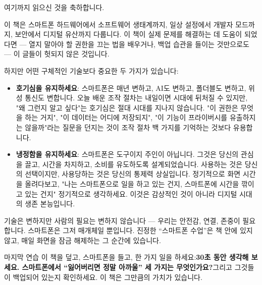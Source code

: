 
여기까지 읽으신 것을 축하합니다.

이 책은 스마트폰 하드웨어에서 소프트웨어 생태계까지, 일상 설정에서 개발자 모드까지, 보안에서 디지털 유산까지 다룹니다. 이 책이 실제 문제를 해결하는 데 도움이 되었다면 — 열지 말아야 할 권한을 끄는 법을 배우거나, 백업 습관을 들이는 것만으로도 — 이 글들이 헛되지 않은 것입니다.

하지만 어떤 구체적인 기술보다 중요한 두 가지가 있습니다:

\begin{itemize}
  \item \textbf{호기심을 유지하세요}: 스마트폰은 매년 변하고, AI도 변하고, 폴더블도 변하고, 위성 통신도 변합니다. 오늘 배운 조작 절차는 내일이면 시대에 뒤처질 수 있지만, "왜 그런지 알고 싶다"는 호기심은 절대 시대를 지나지 않습니다. "이 권한은 무엇을 하는 거지", "이 데이터는 어디에 저장되지", "이 기능이 프라이버시를 유출하지는 않을까"라는 질문을 던지는 것이 조작 절차 백 가지를 기억하는 것보다 유용합니다.
  \item \textbf{냉정함을 유지하세요}: 스마트폰은 도구이지 주인이 아닙니다. 그것은 당신의 관심을 끌고, 시간을 차지하고, 소비를 유도하도록 설계되었습니다. 사용하는 것은 당신의 선택이지만, 사용당하는 것은 당신의 통제력 상실입니다. 정기적으로 화면 시간을 올려다보고, "나는 스마트폰으로 일을 하고 있는 건지, 스마트폰에 시간을 깎이고 있는 건지" 정기적으로 생각하세요. 이것은 감상적인 것이 아니라 디지털 시대의 생존 본능입니다.
\end{itemize}

기술은 변하지만 사람의 필요는 변하지 않습니다 — 우리는 안전감, 연결, 존중이 필요합니다. 스마트폰은 그저 매개체일 뿐입니다. 진정한 “스마트폰 수업”은 책 안에 있지 않고, 매일 화면을 잠금 해제하는 그 순간에 있습니다.

\begin{tcbpractice}{마지막 연습}
이 책을 덮고, 스마트폰을 들고, 한 가지 일을 하세요:\textbf{30초 동안 생각해 보세요. 스마트폰에서 “잃어버리면 정말 아까울” 세 가지는 무엇인가요?}그리고 그것들이 백업되어 있는지 확인하세요. 이 책은 그만큼의 가치가 있습니다.

\end{tcbpractice}

